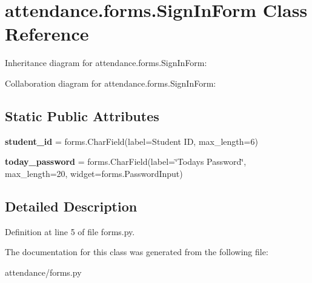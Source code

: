\hypertarget{classattendance_1_1forms_1_1_sign_in_form}{}\section{attendance.\+forms.\+Sign\+In\+Form Class Reference}
\label{classattendance_1_1forms_1_1_sign_in_form}


Inheritance diagram for attendance.\+forms.\+Sign\+In\+Form\+:


Collaboration diagram for attendance.\+forms.\+Sign\+In\+Form\+:
\subsection*{Static Public Attributes}
\begin{DoxyCompactItemize}
\item 
\hypertarget{classattendance_1_1forms_1_1_sign_in_form_af01bf30a0e7d686cb7acd1dd33c2841c}{}\label{classattendance_1_1forms_1_1_sign_in_form_af01bf30a0e7d686cb7acd1dd33c2841c} 
{\bfseries student\+\_\+id} = forms.\+Char\+Field(label=\textquotesingle{}Student ID\textquotesingle{}, max\+\_\+length=6)
\item 
\hypertarget{classattendance_1_1forms_1_1_sign_in_form_a62fb821e231f9bde01a2e5b21e8b9965}{}\label{classattendance_1_1forms_1_1_sign_in_form_a62fb821e231f9bde01a2e5b21e8b9965} 
{\bfseries today\+\_\+password} = forms.\+Char\+Field(label=\char`\"{}Today\textquotesingle{}s Password\char`\"{}, max\+\_\+length=20, widget=forms.\+Password\+Input)
\end{DoxyCompactItemize}


\subsection{Detailed Description}


Definition at line 5 of file forms.\+py.



The documentation for this class was generated from the following file\+:\begin{DoxyCompactItemize}
\item 
attendance/forms.\+py\end{DoxyCompactItemize}
